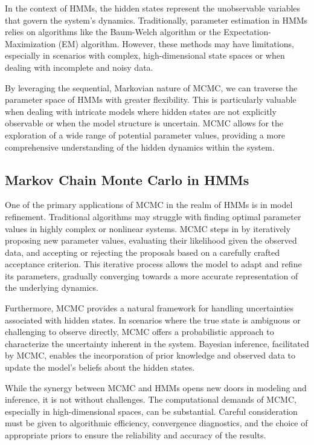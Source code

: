 \documentclass{englishreport}
\begin{document}
In the context of HMMs, the hidden states represent the unobservable variables that govern the system's dynamics. Traditionally, parameter estimation in HMMs relies on algorithms like the Baum-Welch algorithm or the Expectation-Maximization (EM) algorithm. However, these methods may have limitations, especially in scenarios with complex, high-dimensional state spaces or when dealing with incomplete and noisy data.

By leveraging the sequential, Markovian nature of MCMC, we can traverse the parameter space of HMMs with greater flexibility. This is particularly valuable when dealing with intricate models where hidden states are not explicitly observable or when the model structure is uncertain. MCMC allows for the exploration of a wide range of potential parameter values, providing a more comprehensive understanding of the hidden dynamics within the system.

\subsection{Markov Chain Monte Carlo in HMMs}

One of the primary applications of MCMC in the realm of HMMs is in model refinement. Traditional algorithms may struggle with finding optimal parameter values in highly complex or nonlinear systems. MCMC steps in by iteratively proposing new parameter values, evaluating their likelihood given the observed data, and accepting or rejecting the proposals based on a carefully crafted acceptance criterion. This iterative process allows the model to adapt and refine its parameters, gradually converging towards a more accurate representation of the underlying dynamics.

Furthermore, MCMC provides a natural framework for handling uncertainties associated with hidden states. In scenarios where the true state is ambiguous or challenging to observe directly, MCMC offers a probabilistic approach to characterize the uncertainty inherent in the system. Bayesian inference, facilitated by MCMC, enables the incorporation of prior knowledge and observed data to update the model's beliefs about the hidden states.

While the synergy between MCMC and HMMs opens new doors in modeling and inference, it is not without challenges. The computational demands of MCMC, especially in high-dimensional spaces, can be substantial. Careful consideration must be given to algorithmic efficiency, convergence diagnostics, and the choice of appropriate priors to ensure the reliability and accuracy of the results.
\end{document}
